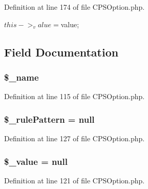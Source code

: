 Definition at line 174 of file CPSOption.php.




\begin{DoxyCode}
{ $this->_value = $value; }
\end{DoxyCode}




\subsection{Field Documentation}
\hypertarget{classCPSOption_a1c89defaf5aa7ac8e526065e8572f580}{
\subsubsection[{\$\_\-name}]{\setlength{\rightskip}{0pt plus 5cm}\$\_\-name}}
\label{classCPSOption_a1c89defaf5aa7ac8e526065e8572f580}


Definition at line 115 of file CPSOption.php.

\hypertarget{classCPSOption_aead9fa97d5e656f3765bf21735a19167}{
\subsubsection[{\$\_\-rulePattern}]{\setlength{\rightskip}{0pt plus 5cm}\$\_\-rulePattern = null}}
\label{classCPSOption_aead9fa97d5e656f3765bf21735a19167}


Definition at line 127 of file CPSOption.php.

\hypertarget{classCPSOption_a599c02a4727030b8ecc632f7c8adafeb}{
\subsubsection[{\$\_\-value}]{\setlength{\rightskip}{0pt plus 5cm}\$\_\-value = null}}
\label{classCPSOption_a599c02a4727030b8ecc632f7c8adafeb}


Definition at line 121 of file CPSOption.php.

